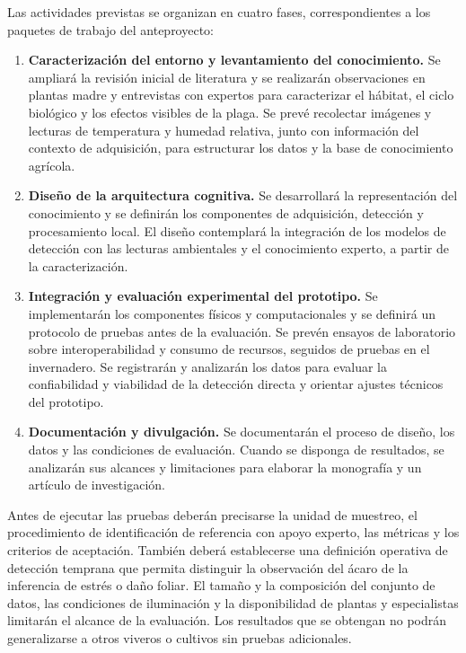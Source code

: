 Las actividades previstas se organizan en cuatro fases, correspondientes a los
paquetes de trabajo del anteproyecto:
\begin{enumerate}
    \item \textbf{Caracterización del entorno y levantamiento del conocimiento.}
    Se ampliará la revisión inicial de literatura y se realizarán observaciones
    en plantas madre y entrevistas con expertos para caracterizar el hábitat,
    el ciclo biológico y los efectos visibles de la plaga. Se prevé recolectar
    imágenes y lecturas de temperatura y humedad relativa, junto con información
    del contexto de adquisición, para estructurar los datos y la base de
    conocimiento agrícola.
    \item \textbf{Diseño de la arquitectura cognitiva.}
    Se desarrollará la representación del conocimiento y se definirán los
    componentes de adquisición, detección y procesamiento local. El diseño
    contemplará la integración de los modelos de detección con las lecturas
    ambientales y el conocimiento experto, a partir de la caracterización.
    \item \textbf{Integración y evaluación experimental del prototipo.}
    Se implementarán los componentes físicos y computacionales y se definirá
    un protocolo de pruebas antes de la evaluación. Se prevén ensayos de
    laboratorio sobre interoperabilidad y consumo de recursos, seguidos de
    pruebas en el invernadero. Se registrarán y analizarán los datos para
    evaluar la confiabilidad y viabilidad de la detección directa y orientar
    ajustes técnicos del prototipo.
    \item \textbf{Documentación y divulgación.}
    Se documentarán el proceso de diseño, los datos y las condiciones de
    evaluación. Cuando se disponga de resultados, se analizarán sus alcances y
    limitaciones para elaborar la monografía y un artículo de investigación.
\end{enumerate}

Antes de ejecutar las pruebas deberán precisarse la unidad de muestreo, el
procedimiento de identificación de referencia con apoyo experto, las métricas
y los criterios de aceptación. También deberá establecerse una definición
operativa de detección temprana que permita distinguir la observación del
ácaro de la inferencia de estrés o daño foliar. El tamaño y la composición del
conjunto de datos, las condiciones de iluminación y la disponibilidad de
plantas y especialistas limitarán el alcance de la evaluación. Los resultados
que se obtengan no podrán generalizarse a otros viveros o cultivos sin pruebas
adicionales.

